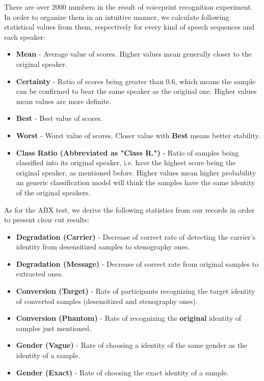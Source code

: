 \documentclass[journal]{IEEEtran} %
\begin{document}
There are over 2000 numbers in the result of voiceprint recognition experiment. In order to organize them in an intuitive manner, we calculate following statistical values from them, respectively for every kind of speech sequences and each speaker:

\begin{itemize}
    \item \textbf{Mean} - Average value of scores. Higher values mean generally closer to the original speaker.
    \item \textbf{Certainty} - Ratio of scores being greater than 0.6, which means the sample can be confirmed to bear the same speaker as the original one. Higher values mean values are more definite.
    \item \textbf{Best} - Best value of scores.
    \item \textbf{Worst} - Worst value of scores. Closer value with \textbf{Best} means better stability.
    \item \textbf{Class Ratio (Abbreviated as "Class R.")} - Ratio of samples being classified into its original speaker, i.e. have the highest score being the original speaker, as mentioned before. Higher values mean higher probability an generic classification model will think the samples have the same identity of the original speakers.
\end{itemize}

As for the ABX test, we derive the following statistics from our records in order to present clear cut results:

\begin{itemize}
    \item \textbf{Degradation (Carrier)} - Decrease of correct rate of detecting the carrier's identity from desensitized samples to stenography ones.
    \item \textbf{Degradation (Message)} - Decrease of correct rate from original samples to extracted ones.
    \item \textbf{Conversion (Target)} - Rate of participants recognizing the target identity of converted samples (desensitized and stenography ones).
    \item \textbf{Conversion (Phantom)} - Rate of recognizing the \textbf{original} identity of samples just mentioned.
    \item \textbf{Gender (Vague)} - Rate of choosing a identity of the same gender as the identity of a sample.
    \item \textbf{Gender (Exact)} - Rate of choosing the exact identity of a sample.
\end{itemize}
\end{document}
